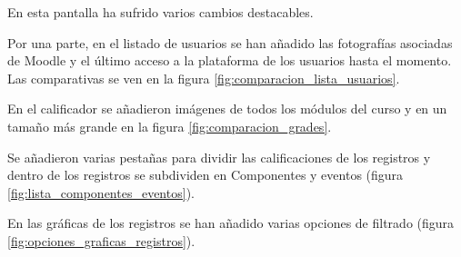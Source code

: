En esta pantalla ha sufrido varios cambios destacables.

Por una parte, en el listado de usuarios se han añadido las fotografías asociadas de Moodle y el último acceso a la plataforma de los usuarios hasta el momento. Las comparativas se ven en la figura \ref{fig:comparacion_lista_usuarios}.


En el calificador se añadieron imágenes de todos los módulos del curso y en un tamaño más grande en la figura \ref{fig:comparacion_grades}. 

Se añadieron varias pestañas para dividir las calificaciones de los registros y dentro de los registros se subdividen en Componentes y eventos (figura \ref{fig:lista_componentes_eventos}).


En las gráficas de los registros se han añadido varias opciones de filtrado (figura \ref{fig:opciones_graficas_registros}).

